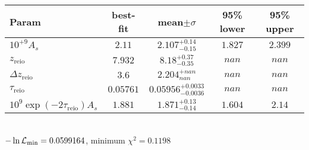 \begin{tabular}{|l|c|c|c|c|} 
 \hline 
Param & best-fit & mean$\pm\sigma$ & 95\% lower & 95\% upper \\ \hline 
$10^{+9}A_{s }$ &$2.11$ & $2.107_{-0.15}^{+0.14}$ & $1.827$ & $2.399$ \\ 
$z_\mathrm{reio}$ &$7.932$ & $8.18_{-0.35}^{+0.37}$ & $nan$ & $nan$ \\ 
$\Delta z_\mathrm{reio}$ &$3.6$ & $2.204_{nan}^{+nan}$ & $nan$ & $nan$ \\ 
$\tau_\mathrm{reio}$ &$0.05761$ & $0.05956_{-0.0036}^{+0.0033}$ & $nan$ & $nan$ \\ 
$10^9 \exp(-2 \tau_\mathrm{reio}) A_s$ &$1.881$ & $1.871_{-0.14}^{+0.13}$ & $1.604$ & $2.14$ \\ 
\hline 
 \end{tabular} \\ 
$-\ln{\cal L}_\mathrm{min} =0.0599164$, minimum $\chi^2=0.1198$ \\ 
